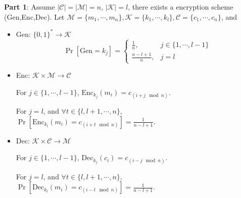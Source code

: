 \documentclass[12pt]{article}
\newcommand{\K}{\mathcal{K}}
\newcommand{\M}{\mathcal{M}}
\newcommand{\C}{\mathcal{C}}
\newcommand{\Enc}{\text{Enc}}
\newcommand{\Dec}{\text{Dec}}
\newcommand{\Gen}{\text{Gen}}
\newenvironment{problem}[2][Problem]{\begin{trivlist}
\item[\hskip \labelsep {\bfseries #1}\hskip \labelsep {\bfseries #2.}]}{\end{trivlist}}
\begin{document}
\begin{problem}{2.11} 
\textbf{Part 1}: 
Assume $\mid\C\mid=\mid\M\mid=n$, $\mid\K\mid=l$, there exists a encryption scheme (Gen,Enc,Dec). Let $\M=\{m_1,\cdots,m_n\},\K=\{k_1,\cdots,k_l\},\C=\{c_1,\cdots,c_n\}$, and\begin{itemize}
    \item Gen: $\{0,1\}^*\rightarrow\K$
		\begin{equation*}  
			\Pr[\Gen=k_j]= \begin{cases}
					\frac 1n, &  j\in\{1,\cdots,l-1\} \\  
					\frac {n-l+1}{n}, & j=l  
				\end{cases} 
		\end{equation*}
    \item Enc: $\K\times\M\rightarrow\C$\par
    For $j\in\{1,\cdots,l-1\}$, $\Enc_{k_j}(m_i)=c_{(i+j\mod n)}$.\par
    For $j=l$, and $\forall t\in\{l,l+1,\cdots,n\}$, $\Pr[\Enc_{k_l}(m_i)=c_{(i+t \mod n)}]=\frac {1}{n-l+1}$.
    \item Dec: $\K\times\C\rightarrow\M$ \par
    For $j\in\{1,\cdots,l-1\}$, $\Dec_{k_j}(c_i)=c_{(i-j\mod n)}$.\par
    For $j=l$, and $\forall t\in\{l,l+1,\cdots,n\}$, $\Pr[\Dec_{k_l}(m_i)=c_{(i-t \mod n)}]=\frac {1}{n-l+1}$.
\end{itemize}\par


\end{problem}
\end{document}
